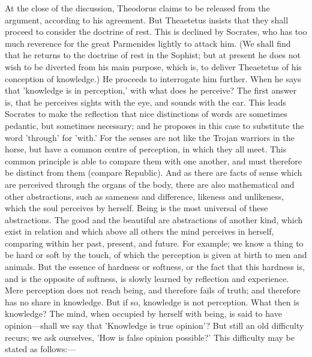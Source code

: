 \documentclass[11pt,letter]{article}
\begin{document}
\par  At the close of the discussion, Theodorus claims to be released from the argument, according to his agreement. But Theaetetus insists that they shall proceed to consider the doctrine of rest. This is declined by Socrates, who has too much reverence for the great Parmenides lightly to attack him. (We shall find that he returns to the doctrine of rest in the Sophist; but at present he does not wish to be diverted from his main purpose, which is, to deliver Theaetetus of his conception of knowledge.) He proceeds to interrogate him further. When he says that 'knowledge is in perception,' with what does he perceive? The first answer is, that he perceives sights with the eye, and sounds with the ear. This leads Socrates to make the reflection that nice distinctions of words are sometimes pedantic, but sometimes necessary; and he proposes in this case to substitute the word 'through' for 'with.' For the senses are not like the Trojan warriors in the horse, but have a common centre of perception, in which they all meet. This common principle is able to compare them with one another, and must therefore be distinct from them (compare Republic). And as there are facts of sense which are perceived through the organs of the body, there are also mathematical and other abstractions, such as sameness and difference, likeness and unlikeness, which the soul perceives by herself. Being is the most universal of these abstractions. The good and the beautiful are abstractions of another kind, which exist in relation and which above all others the mind perceives in herself, comparing within her past, present, and future. For example; we know a thing to be hard or soft by the touch, of which the perception is given at birth to men and animals. But the essence of hardness or softness, or the fact that this hardness is, and is the opposite of softness, is slowly learned by reflection and experience. Mere perception does not reach being, and therefore fails of truth; and therefore has no share in knowledge. But if so, knowledge is not perception. What then is knowledge? The mind, when occupied by herself with being, is said to have opinion—shall we say that 'Knowledge is true opinion'? But still an old difficulty recurs; we ask ourselves, 'How is false opinion possible?' This difficulty may be stated as follows:—
\end{document}
